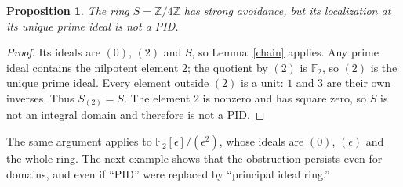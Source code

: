 \documentclass[11pt]{article}
\newtheorem{proposition}{Proposition}
\begin{document}
\begin{proposition}\label{finite}
The ring $S=\mathbb Z/4\mathbb Z$ has strong avoidance, but its localization
at its unique prime ideal is not a PID.
\end{proposition}
\begin{proof}
Its ideals are $(0)$, $(2)$ and $S$, so Lemma~\ref{chain} applies.
Any prime ideal contains the nilpotent element $2$; the quotient by $(2)$ is
$\mathbb F_2$, so $(2)$ is the unique prime ideal. Every element outside
$(2)$ is a unit: $1$ and $3$ are their own inverses. Thus $S_{(2)}=S$.
The element $2$ is nonzero and has square zero, so $S$ is not an integral
domain and therefore is not a PID.
\end{proof}

The same argument applies to $\mathbb F_2[\epsilon]/(\epsilon^2)$, whose
ideals are $(0)$, $(\epsilon)$ and the whole ring. The next example shows
that the obstruction persists even for domains, and even if ``PID'' were
replaced by ``principal ideal ring.''
\end{document}
